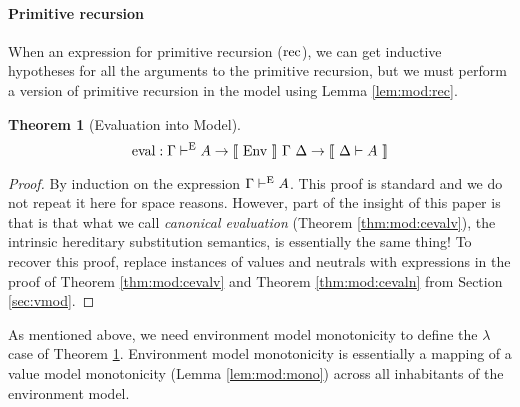 \documentclass[preprint,nonatbib]{sigplanconf}
\numberwithin{subdefin}{defin}
\theoremstyle{definition}
\newtheorem{theorem}{Theorem}
\numberwithin{subtheorem}{theorem}
\numberwithin{sublemma}{theorem}
\numberwithin{corollary}{theorem}
\numberwithin{case}{theorem}
\numberwithin{slcase}{sublemma}
\numberwithin{scase}{subtheorem}
\numberwithin{lcase}{lemma}
\newcommand{\refthm}[1]{Theorem \ref{thm:#1}}
\newcommand{\reflem}[1]{Lemma \ref{lem:#1}}
\newcommand{\refsec}[1]{Section \ref{sec:#1}}
\def\marr{\rightarrow}
\def\lam{\lambda}
\def\rec{\fun{rec}}
\newcommand{\turn}[1]{\vdash^\con{#1}}
\newcommand{\el}[1]{\llbracket ~ #1 ~ \rrbracket}
\newcommand{\con}[1]{\textmd{#1}}
\newcommand{\fun}[1]{\textmd{#1}}
\newcommand{\dtypm}[1]{\el{\Delta \vdash #1}}
\newcommand{\type}[1]{\Gamma \turn{E} #1}
\def\menv{\el{\fun{Env}}~\Gamma~\Delta}
\begin{document}
\paragraph{Primitive recursion} When an expression for primitive
recursion ($\rec$), we can get inductive hypotheses for all the
arguments to the primitive recursion, but we must perform a version of
primitive recursion in the model using \reflem{mod:rec}.

\begin{theorem}[Evaluation into Model]
\label{thm:mod:eval}
$$
\fun{eval} : \type{A} \marr \menv \marr \dtypm{A}
$$

\begin{proof}

By induction on the expression $\type{A}$. This proof is standard and
we do not repeat it here for space reasons. However, part of the
insight of this paper is that is that what we call
{\it canonical evaluation} (\refthm{mod:cevalv}), the intrinsic hereditary substitution
semantics, is essentially the same thing! To recover this proof,
replace instances of values and neutrals with expressions in the proof
of \refthm{mod:cevalv} and \refthm{mod:cevaln} from \refsec{vmod}.

\end{proof}

\end{theorem}

As mentioned above, we need environment model monotonicity
to define the $\lam$ case of \refthm{mod:eval}. Environment model
monotonicity is essentially a mapping of a value model
monotonicity (\reflem{mod:mono}) across all inhabitants of the
environment model.
\end{document}
